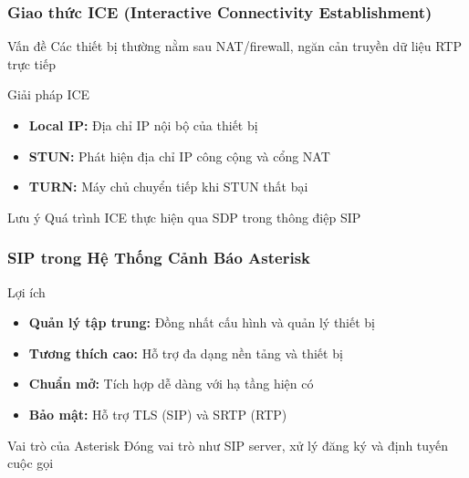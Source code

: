 \begin{frame}
\frametitle{Giao thức ICE (Interactive Connectivity Establishment)}

\begin{block}{Vấn đề}
Các thiết bị thường nằm sau NAT/firewall, ngăn cản truyền dữ liệu RTP trực tiếp
\end{block}

\begin{block}{Giải pháp ICE}
\begin{itemize}
\item \textbf{Local IP:} Địa chỉ IP nội bộ của thiết bị
\item \textbf{STUN:} Phát hiện địa chỉ IP công cộng và cổng NAT
\item \textbf{TURN:} Máy chủ chuyển tiếp khi STUN thất bại
\end{itemize}
\end{block}

\begin{alertblock}{Lưu ý}
Quá trình ICE thực hiện qua SDP trong thông điệp SIP
\end{alertblock}

\end{frame}

\begin{frame}
\frametitle{SIP trong Hệ Thống Cảnh Báo Asterisk}

\begin{block}{Lợi ích}
\begin{itemize}
\item \textbf{Quản lý tập trung:} Đồng nhất cấu hình và quản lý thiết bị
\item \textbf{Tương thích cao:} Hỗ trợ đa dạng nền tảng và thiết bị
\item \textbf{Chuẩn mở:} Tích hợp dễ dàng với hạ tầng hiện có
\item \textbf{Bảo mật:} Hỗ trợ TLS (SIP) và SRTP (RTP)
\end{itemize}
\end{block}

\begin{block}{Vai trò của Asterisk}
Đóng vai trò như SIP server, xử lý đăng ký và định tuyến cuộc gọi
\end{block}

\end{frame}

